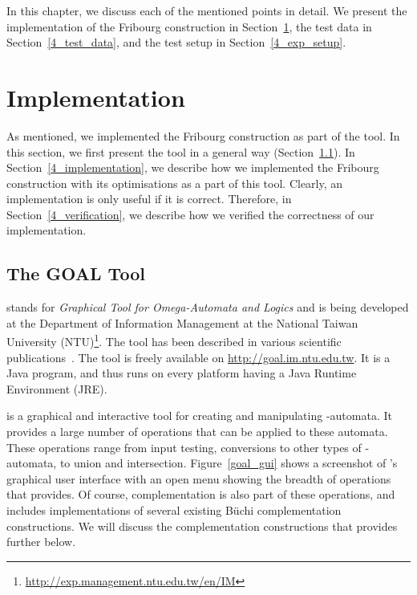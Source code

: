 
In this chapter, we discuss each of the mentioned points in detail. We present the implementation of the Fribourg construction in Section~\ref{4_impl}, the test data in Section~\ref{4_test_data}, and the test setup in Section~\ref{4_exp_setup}.


\section{Implementation}
\label{4_impl}
As mentioned, we implemented the Fribourg construction as part of the \goal{} tool. In this section, we first present the \goal{} tool in a general way (Section~\ref{4_goal}). In Section~\ref{4_implementation}, we describe how we implemented the Fribourg construction with its optimisations as a part of this tool. Clearly, an implementation is only useful if it is correct. Therefore, in Section~\ref{4_verification}, we describe how we verified the correctness of our implementation.


\subsection{The GOAL Tool}
\label{4_goal}
\goal{} stands for \textit{Graphical Tool for Omega-Automata and Logics} and is being developed at the Department of Information Management at the National Taiwan University (NTU)\footnote{\url{http://exp.management.ntu.edu.tw/en/IM}}. The tool has been described in various scientific publications~\cite{2007_goal,2008_goal_ext,2009_goal,2013_goal}. The \goal{} tool is freely available on \url{http://goal.im.ntu.edu.tw}. It is a Java program, and thus runs on every platform having a Java Runtime Environment (JRE).

\goal{} is a graphical and interactive tool for creating and manipulating \om-automata. It provides a large number of operations that can be applied to these automata. These operations range from input testing, conversions to other types of \om-automata, to union and intersection. Figure~\ref{goal_gui} shows a screenshot of \goal's graphical user interface with an open menu showing the breadth of operations that \goal{} provides. Of course, complementation is also part of these operations, and \goal{} includes implementations of several existing Büchi complementation constructions. We will discuss the complementation constructions that \goal{} provides further below.

